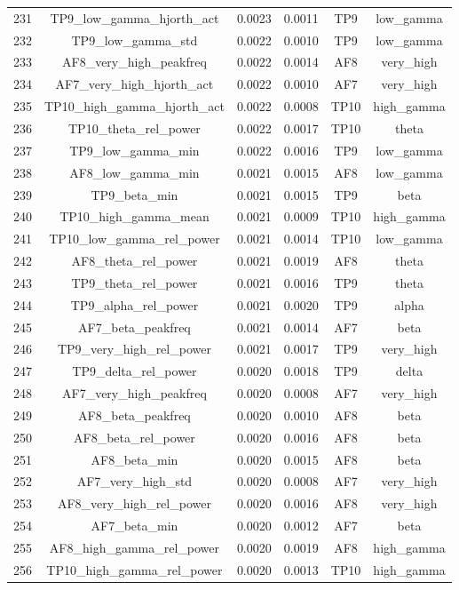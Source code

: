 \begin{table}[hptb]
\begin{table}
\begin{tabular}{cccccc}
231 & TP9_low_gamma_hjorth_act & 0.0023 & 0.0011 & TP9 & low_gamma \\
232 & TP9_low_gamma_std & 0.0022 & 0.0010 & TP9 & low_gamma \\
233 & AF8_very_high_peakfreq & 0.0022 & 0.0014 & AF8 & very_high \\
234 & AF7_very_high_hjorth_act & 0.0022 & 0.0010 & AF7 & very_high \\
235 & TP10_high_gamma_hjorth_act & 0.0022 & 0.0008 & TP10 & high_gamma \\
236 & TP10_theta_rel_power & 0.0022 & 0.0017 & TP10 & theta \\
237 & TP9_low_gamma_min & 0.0022 & 0.0016 & TP9 & low_gamma \\
238 & AF8_low_gamma_min & 0.0021 & 0.0015 & AF8 & low_gamma \\
239 & TP9_beta_min & 0.0021 & 0.0015 & TP9 & beta \\
240 & TP10_high_gamma_mean & 0.0021 & 0.0009 & TP10 & high_gamma \\
241 & TP10_low_gamma_rel_power & 0.0021 & 0.0014 & TP10 & low_gamma \\
242 & AF8_theta_rel_power & 0.0021 & 0.0019 & AF8 & theta \\
243 & TP9_theta_rel_power & 0.0021 & 0.0016 & TP9 & theta \\
244 & TP9_alpha_rel_power & 0.0021 & 0.0020 & TP9 & alpha \\
245 & AF7_beta_peakfreq & 0.0021 & 0.0014 & AF7 & beta \\
246 & TP9_very_high_rel_power & 0.0021 & 0.0017 & TP9 & very_high \\
247 & TP9_delta_rel_power & 0.0020 & 0.0018 & TP9 & delta \\
248 & AF7_very_high_peakfreq & 0.0020 & 0.0008 & AF7 & very_high \\
249 & AF8_beta_peakfreq & 0.0020 & 0.0010 & AF8 & beta \\
250 & AF8_beta_rel_power & 0.0020 & 0.0016 & AF8 & beta \\
251 & AF8_beta_min & 0.0020 & 0.0015 & AF8 & beta \\
252 & AF7_very_high_std & 0.0020 & 0.0008 & AF7 & very_high \\
253 & AF8_very_high_rel_power & 0.0020 & 0.0016 & AF8 & very_high \\
254 & AF7_beta_min & 0.0020 & 0.0012 & AF7 & beta \\
255 & AF8_high_gamma_rel_power & 0.0020 & 0.0019 & AF8 & high_gamma \\
256 & TP10_high_gamma_rel_power & 0.0020 & 0.0013 & TP10 & high_gamma \\

\end{tabular}
\end{table}
\end{table}
